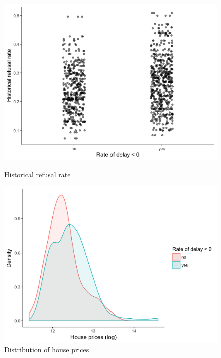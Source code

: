 \documentclass[12pt,letterpaper]{article}
\begin{document}
\newpage

\begin{figure}[h!]
\begin{minipage}[t]{0.5\linewidth}
    \includegraphics[width=\linewidth]{refusal.png}
    \caption{Historical refusal rate }
    \label{refusal_restrictive}
\end{minipage}%
\begin{minipage}[t]{0.45\linewidth}
    \includegraphics[width=\linewidth]{dens_complete.png}
    \caption{Distribution of house prices}
    \label{f2}
\end{minipage} 
\end{figure}


\newpage
\end{document}
